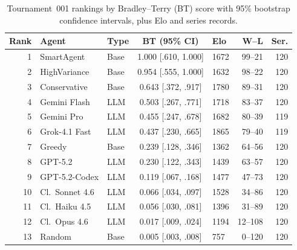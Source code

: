 \documentclass[11pt]{article}
\begin{document}
\begin{table}[t]
\centering
\small
\caption{Tournament~001 rankings by Bradley--Terry (BT) score with 95\% bootstrap confidence intervals, plus Elo and series records.}
\label{tab:t1_rank}
\begin{tabular}{rllclrr}
\toprule
Rank & Agent & Type & BT (95\% CI) & Elo & W--L & Ser. \\
\midrule
1 & SmartAgent & Base & 1.000 [.610, 1.000] & 1672 & 99--21 & 120 \\
2 & HighVariance & Base & 0.954 [.555, 1.000] & 1632 & 98--22 & 120 \\
3 & Conservative & Base & 0.643 [.372, .917] & 1780 & 89--31 & 120 \\
4 & Gemini Flash & LLM & 0.503 [.267, .771] & 1718 & 83--37 & 120 \\
5 & Gemini Pro & LLM & 0.455 [.247, .678] & 1682 & 80--39 & 119 \\
6 & Grok-4.1 Fast & LLM & 0.437 [.230, .665] & 1865 & 79--40 & 119 \\
7 & Greedy & Base & 0.239 [.128, .346] & 1362 & 64--56 & 120 \\
8 & GPT-5.2 & LLM & 0.230 [.122, .343] & 1439 & 63--57 & 120 \\
9 & GPT-5.2-Codex & LLM & 0.119 [.067, .168] & 1477 & 47--73 & 120 \\
10 & Cl.\ Sonnet 4.6 & LLM & 0.066 [.034, .097] & 1528 & 34--86 & 120 \\
11 & Cl.\ Haiku 4.5 & LLM & 0.056 [.030, .081] & 1396 & 31--89 & 120 \\
12 & Cl.\ Opus 4.6 & LLM & 0.017 [.009, .024] & 1194 & 12--108 & 120 \\
13 & Random & Base & 0.005 [.003, .008] & 757 & 0--120 & 120 \\
\bottomrule
\end{tabular}
\end{table}
\end{document}
